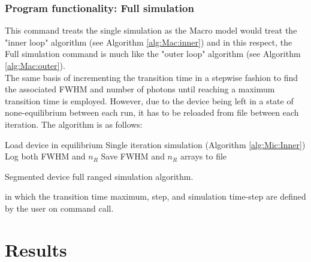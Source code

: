 \documentclass[titlepage]{article}
\begin{document}
\subsubsection{Program functionality: Full simulation}\label{sec:Mic:FullSim}
This command treats the single simulation as the Macro model would treat the "inner loop" algorithm (see Algorithm \ref{alg:Mac:inner}) and in this respect, the Full simulation command is much like the "outer loop" algorithm (see Algorithm \ref{alg:Mac:outer}).\\
The same basis of incrementing the transition time in a stepwise fashion to find the associated FWHM and number of photons until reaching a maximum transition time is employed. However, due to the device being left in a state of none-equilibrium between each run, it has to be reloaded from file between each iteration. The algorithm is as follows:\\
\begin{algorithm}[H]
	{
		Load device in equilibrium\;
		Single iteration simulation (Algorithm \ref{alg:Mic:Inner})\;
		Log both FWHM and $n_R$\;
	}
	Save FWHM and $n_R$ arrays to file\;
	\caption{\label{alg:Mic:Outer} Segmented device full ranged simulation algorithm.}
\end{algorithm}
in which the transition time maximum, step, and simulation time-step are defined by the user on command call.
















\section{Results}
\end{document}
